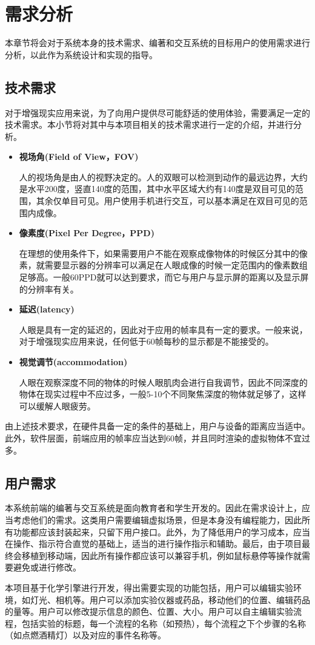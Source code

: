 \chapter{需求分析}
\label{requirement}

本章节将会对于系统本身的技术需求、编著和交互系统的目标用户的使用需求进行分析，以此作为系统设计和实现的指导。

\section{技术需求}
对于增强现实应用来说，为了向用户提供尽可能舒适的使用体验，需要满足一定的技术需求。本小节将对其中与本项目相关的技术需求\cite{artech}进行一定的介绍，并进行分析。

\begin{itemize}
    \item \textbf{视场角(Field of View，FOV)}
    
       人的视场角是由人的视野决定的。人的双眼可以检测到动作的最远边界，大约是水平200度，竖直140度的范围，其中水平区域大约有140度是双目可见的范围，其余仅单目可见。用户使用手机进行交互，可以基本满足在双目可见的范围内成像。
    
    \item \textbf{像素度(Pixel Per Degree，PPD)}
    
     在理想的使用条件下，如果需要用户不能在观察成像物体的时候区分其中的像素，就需要显示器的分辨率可以满足在人眼成像的时候一定范围内的像素数组足够高。一般60PPD就可以达到要求，而它与用户与显示屏的距离以及显示屏的分辨率有关。
    
    \item \textbf{延迟(latency)}
    
      人眼是具有一定的延迟的，因此对于应用的帧率具有一定的要求。一般来说，对于增强现实应用来说，任何低于60帧每秒的显示都是不能接受的。
    
    \item \textbf{视觉调节(accommodation)}
    
    人眼在观察深度不同的物体的时候人眼肌肉会进行自我调节，因此不同深度的物体在现实过程中不应过多，一般5-10个不同聚焦深度的物体就足够了，这样可以缓解人眼疲劳。
\end{itemize}

\indent    	由上述技术要求，在硬件具备一定的条件的基础上，用户与设备的距离应当适中。此外，软件层面，前端应用的帧率应当达到60帧，并且同时渲染的虚拟物体不宜过多。

\section{用户需求}
本系统前端的编著与交互系统是面向教育者和学生开发的。因此在需求设计上，应当考虑他们的需求。这类用户需要编辑虚拟场景，但是本身没有编程能力，因此所有功能都应该封装起来，只留下用户接口。此外，为了降低用户的学习成本，应当在操作、指示符合直觉的基础上，适当的进行操作指示和辅助。最后，由于项目最终会移植到移动端，因此所有操作都应该可以兼容手机，例如鼠标悬停等操作就需要避免或进行修改。

本项目基于化学引擎进行开发，得出需要实现的功能包括，用户可以编辑实验环境，如灯光、相机等。用户可以添加实验仪器或药品，移动他们的位置、编辑药品的量等。用户可以修改提示信息的颜色、位置、大小。用户可以自主编辑实验流程，包括实验的标题，每一个流程的名称（如预热），每个流程之下个步骤的名称（如点燃酒精灯）以及对应的事件名称等。